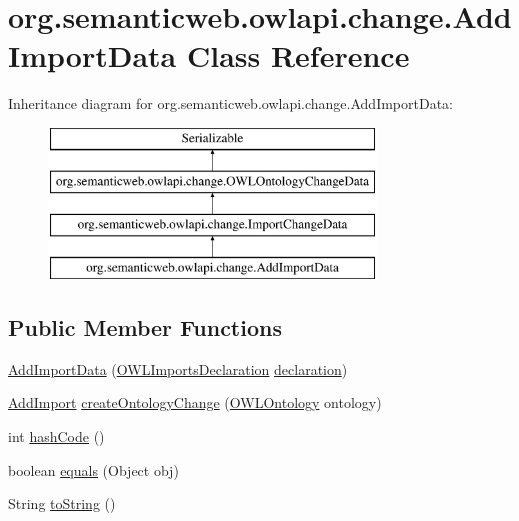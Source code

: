 \hypertarget{classorg_1_1semanticweb_1_1owlapi_1_1change_1_1_add_import_data}{\section{org.\-semanticweb.\-owlapi.\-change.\-Add\-Import\-Data Class Reference}
\label{classorg_1_1semanticweb_1_1owlapi_1_1change_1_1_add_import_data}
}
Inheritance diagram for org.\-semanticweb.\-owlapi.\-change.\-Add\-Import\-Data\-:\begin{figure}[H]
\begin{center}
\leavevmode
\includegraphics[height=4.000000cm]{classorg_1_1semanticweb_1_1owlapi_1_1change_1_1_add_import_data}
\end{center}
\end{figure}
\subsection*{Public Member Functions}
\begin{DoxyCompactItemize}
\item 
\hyperlink{classorg_1_1semanticweb_1_1owlapi_1_1change_1_1_add_import_data_a2de285def2b1bc16b5f13c9fd8f18640}{Add\-Import\-Data} (\hyperlink{interfaceorg_1_1semanticweb_1_1owlapi_1_1model_1_1_o_w_l_imports_declaration}{O\-W\-L\-Imports\-Declaration} \hyperlink{classorg_1_1semanticweb_1_1owlapi_1_1change_1_1_import_change_data_a23afda3aff2c6ee273efff9db5bb5315}{declaration})
\item 
\hyperlink{classorg_1_1semanticweb_1_1owlapi_1_1model_1_1_add_import}{Add\-Import} \hyperlink{classorg_1_1semanticweb_1_1owlapi_1_1change_1_1_add_import_data_a5e0aa81eeae6a3b23ead63c0e1f8c5f5}{create\-Ontology\-Change} (\hyperlink{interfaceorg_1_1semanticweb_1_1owlapi_1_1model_1_1_o_w_l_ontology}{O\-W\-L\-Ontology} ontology)
\item 
int \hyperlink{classorg_1_1semanticweb_1_1owlapi_1_1change_1_1_add_import_data_a3e4842439799efec5adc439314830192}{hash\-Code} ()
\item 
boolean \hyperlink{classorg_1_1semanticweb_1_1owlapi_1_1change_1_1_add_import_data_adfdf93bf90c3275cc7c89edbac71a9cd}{equals} (Object obj)
\item 
String \hyperlink{classorg_1_1semanticweb_1_1owlapi_1_1change_1_1_add_import_data_ad199c84ed6f4255b4c73edeef25699b4}{to\-String} ()
\end{DoxyCompactItemize}
